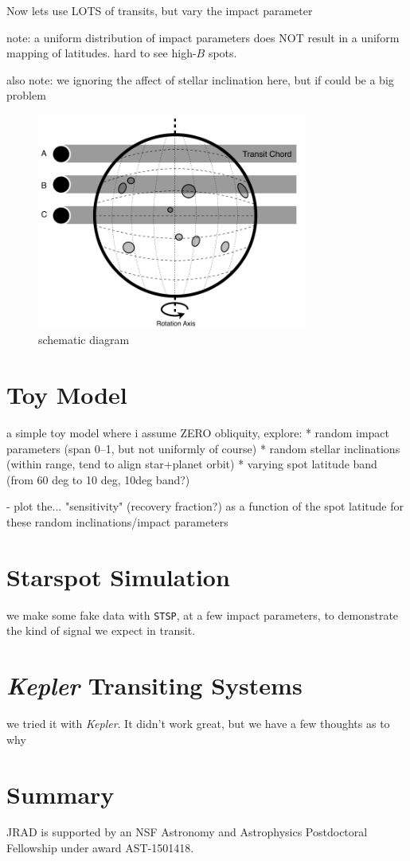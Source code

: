 \documentclass[preprint2]{aastex61}
\newcommand{\Kepler}{\textsl{Kepler}\xspace}
\begin{document}
Now lets use LOTS of transits, but vary the impact parameter

note: a uniform distribution of impact parameters does NOT result in a uniform mapping of latitudes. hard to see high-$B$ spots.

also note: we ignoring the affect of stellar inclination here, but if could be a big problem

\begin{figure}[!t]
\centering
\includegraphics[width=3.5in]{diagram1}
\caption{schematic diagram}
\label{fig:diagram}
\end{figure}



\section{Toy Model}
a simple toy model where i assume ZERO obliquity, explore:
* random impact parameters (span 0--1, but not uniformly of course)
* random stellar inclinations (within range, tend to align star+planet orbit)
* varying spot latitude band (from 60 deg to 10 deg, 10deg band?)

- plot the... "sensitivity" (recovery fraction?) as a function of the spot latitude for these random inclinations/impact parameters


\section{Starspot Simulation}
we make some fake data with {\tt STSP}, at a few impact parameters, to demonstrate the kind of signal we expect in transit.


\section{\Kepler Transiting Systems}
we tried it with \Kepler. It didn't work great, but we have a few thoughts as to why




\section{Summary}
\label{sec:summary}


\acknowledgments

JRAD is supported by an NSF Astronomy and Astrophysics Postdoctoral Fellowship under award AST-1501418. 



\end{document}
